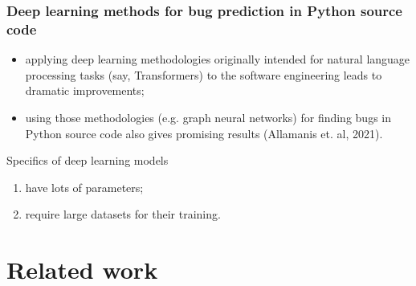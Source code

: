 \documentclass{beamer}
\begin{document}





\begin{frame}
\frametitle{Deep learning methods for bug prediction in Python source code}

\begin{itemize}
\item applying deep learning methodologies originally intended for natural language processing tasks (say, Transformers) to the software engineering leads to dramatic improvements;
\item using those methodologies (e.g. graph neural networks) for finding bugs in Python source code also gives promising results (Allamanis et. al, 2021).
\end{itemize}

\begin{block}{Specifics of deep learning models}
\begin{enumerate}
\item have lots of parameters;
\item require large datasets for their training.
\end{enumerate}
\end{block}

\end{frame}


\section{Related work}
\end{document}

